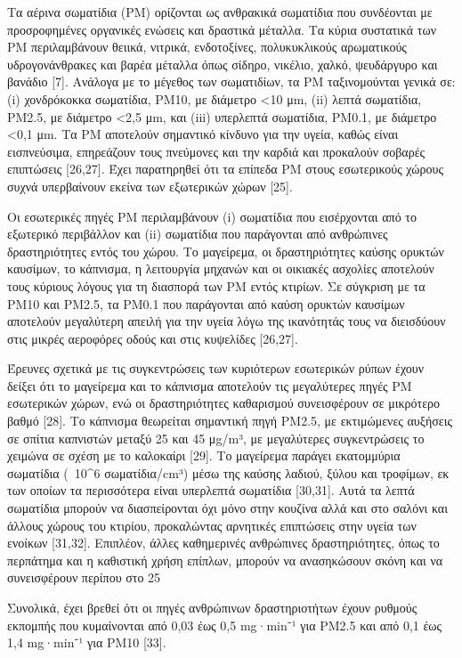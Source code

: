 \cite{ijerph17238972}

Τα αέρινα σωματίδια (PM) ορίζονται ως ανθρακικά σωματίδια που συνδέονται με προσροφημένες οργανικές ενώσεις και δραστικά μέταλλα. Τα κύρια συστατικά των PM περιλαμβάνουν θειικά, νιτρικά, ενδοτοξίνες, πολυκυκλικούς αρωματικούς υδρογονάνθρακες και βαρέα μέταλλα όπως σίδηρο, νικέλιο, χαλκό, ψευδάργυρο και βανάδιο [7]. Ανάλογα με το μέγεθος των σωματιδίων, τα PM ταξινομούνται γενικά σε: (i) χονδρόκοκκα σωματίδια, PM10, με διάμετρο <10 μm, (ii) λεπτά σωματίδια, PM2.5, με διάμετρο <2,5 μm, και (iii) υπερλεπτά σωματίδια, PM0.1, με διάμετρο <0,1 μm. Τα PM αποτελούν σημαντικό κίνδυνο για την υγεία, καθώς είναι εισπνεύσιμα, επηρεάζουν τους πνεύμονες και την καρδιά και προκαλούν σοβαρές επιπτώσεις [26,27]. Έχει παρατηρηθεί ότι τα επίπεδα PM στους εσωτερικούς χώρους συχνά υπερβαίνουν εκείνα των εξωτερικών χώρων [25].

Οι εσωτερικές πηγές PM περιλαμβάνουν (i) σωματίδια που εισέρχονται από το εξωτερικό περιβάλλον και (ii) σωματίδια που παράγονται από ανθρώπινες δραστηριότητες εντός του χώρου. Το μαγείρεμα, οι δραστηριότητες καύσης ορυκτών καυσίμων, το κάπνισμα, η λειτουργία μηχανών και οι οικιακές ασχολίες αποτελούν τους κύριους λόγους για τη διασπορά των PM εντός κτιρίων. Σε σύγκριση με τα PM10 και PM2.5, τα PM0.1 που παράγονται από καύση ορυκτών καυσίμων αποτελούν μεγαλύτερη απειλή για την υγεία λόγω της ικανότητάς τους να διεισδύουν στις μικρές αεροφόρες οδούς και στις κυψελίδες [26,27].

Έρευνες σχετικά με τις συγκεντρώσεις των κυριότερων εσωτερικών ρύπων έχουν δείξει ότι το μαγείρεμα και το κάπνισμα αποτελούν τις μεγαλύτερες πηγές PM εσωτερικών χώρων, ενώ οι δραστηριότητες καθαρισμού συνεισφέρουν σε μικρότερο βαθμό [28]. Το κάπνισμα θεωρείται σημαντική πηγή PM2.5, με εκτιμώμενες αυξήσεις σε σπίτια καπνιστών μεταξύ 25 και 45 μg/m³, με μεγαλύτερες συγκεντρώσεις το χειμώνα σε σχέση με το καλοκαίρι [29]. Το μαγείρεμα παράγει εκατομμύρια σωματίδια (~10^6 σωματίδια/cm³) μέσω της καύσης λαδιού, ξύλου και τροφίμων, εκ των οποίων τα περισσότερα είναι υπερλεπτά σωματίδια [30,31]. Αυτά τα λεπτά σωματίδια μπορούν να διασπείρονται όχι μόνο στην κουζίνα αλλά και στο σαλόνι και άλλους χώρους του κτιρίου, προκαλώντας αρνητικές επιπτώσεις στην υγεία των ενοίκων [31,32]. Επιπλέον, άλλες καθημερινές ανθρώπινες δραστηριότητες, όπως το περπάτημα και η καθιστική χρήση επίπλων, μπορούν να ανασηκώσουν σκόνη και να συνεισφέρουν περίπου στο 25%

Συνολικά, έχει βρεθεί ότι οι πηγές ανθρώπινων δραστηριοτήτων έχουν ρυθμούς εκπομπής που κυμαίνονται από 0,03 έως 0,5 mg·min⁻¹ για PM2.5 και από 0,1 έως 1,4 mg·min⁻¹ για PM10 [33].

